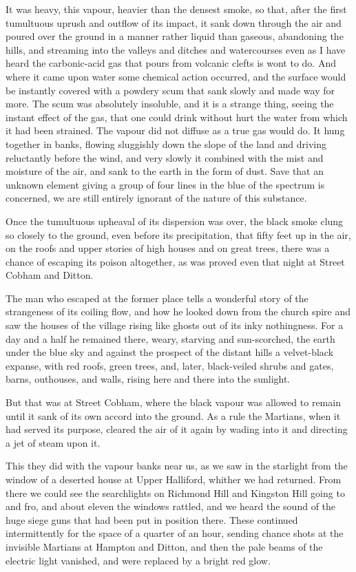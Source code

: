 It was heavy, this vapour, heavier than the densest smoke, so that, after the first tumultuous uprush and outflow of its impact, it sank down through the air and poured over the ground in a manner rather liquid than gaseous, abandoning the hills, and streaming into the valleys and ditches and watercourses even as I have heard the carbonic-acid gas that pours from volcanic clefts is wont to do. And where it came upon water some chemical action occurred, and the surface would be instantly covered with a powdery scum that sank slowly and made way for more. The scum was absolutely insoluble, and it is a strange thing, seeing the instant effect of the gas, that one could drink without hurt the water from which it had been strained. The vapour did not diffuse as a true gas would do. It hung together in banks, flowing sluggishly down the slope of the land and driving reluctantly before the wind, and very slowly it combined with the mist and moisture of the air, and sank to the earth in the form of dust. Save that an unknown element giving a group of four lines in the blue of the spectrum is concerned, we are still entirely ignorant of the nature of this substance.

Once the tumultuous upheaval of its dispersion was over, the black smoke clung so closely to the ground, even before its precipitation, that fifty feet up in the air, on the roofs and upper stories of high houses and on great trees, there was a chance of escaping its poison altogether, as was proved even that night at Street Cobham and Ditton.

The man who escaped at the former place tells a wonderful story of the strangeness of its coiling flow, and how he looked down from the church spire and saw the houses of the village rising like ghosts out of its inky nothingness. For a day and a half he remained there, weary, starving and sun-scorched, the earth under the blue sky and against the prospect of the distant hills a velvet-black expanse, with red roofs, green trees, and, later, black-veiled shrubs and gates, barns, outhouses, and walls, rising here and there into the sunlight.

But that was at Street Cobham, where the black vapour was allowed to remain until it sank of its own accord into the ground. As a rule the Martians, when it had served its purpose, cleared the air of it again by wading into it and directing a jet of steam upon it.

This they did with the vapour banks near us, as we saw in the starlight from the window of a deserted house at Upper Halliford, whither we had returned. From there we could see the searchlights on Richmond Hill and Kingston Hill going to and fro, and about eleven the windows rattled, and we heard the sound of the huge siege guns that had been put in position there. These continued intermittently for the space of a quarter of an hour, sending chance shots at the invisible Martians at Hampton and Ditton, and then the pale beams of the electric light vanished, and were replaced by a bright red glow.

